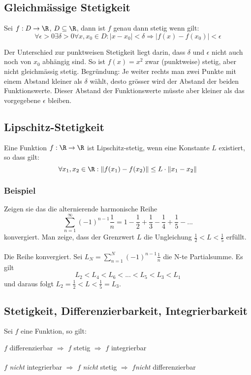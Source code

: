 \subsection{Gleichmässige Stetigkeit}
Sei $f: D \to \R$, $D \subseteq \R$, dann ist $f$ genau dann stetig wenn gilt:
\[
\forall \epsilon > 0 \exists \delta > 0 \forall x,x_0 \in D: |x - x_0| < \delta
\Rightarrow |f(x) - f(x_0)| < \epsilon
\]

Der Unterschied zur punktweisen Stetigkeit liegt darin, dass $\delta$ und
$\epsilon$ nicht auch noch von $x_0$ abhängig sind. So ist $f(x) = x^2$ zwar
(punktweise) stetig, aber nicht gleichmässig stetig. Begründung: Je weiter
rechts man zwei Punkte mit einem Abstand kleiner als $\delta$ wählt, desto
grösser wird der Abstand der beiden Funktionswerte. Dieser Abstand der
Funktionswerte müsste aber kleiner als das vorgegebene $\epsilon$ bleiben.

\subsection{Lipschitz-Stetigkeit}
Eine Funktion $f: \R \to \R$ ist Lipschitz-stetig, wenn eine Konstante $L$
existiert, so dass gilt:
\[
\forall x_1,x_2 \in \R: \|f(x_1) - f(x_2)\| \leq L \cdot \|x_1 - x_2\|
\]

\subsubsection{Beispiel}
Zeigen sie das die alternierende harmonische Reihe \[
\sum_{n=1}^\infty (-1)^{n-1} \frac{1}{n} = 1 - \frac{1}{2} +\frac{1}{3} - \frac{1}{4} + \frac{1}{5} - ...
\]
konvergiert. Man zeige, dass der Grenzwert $L$ die Ungleichung $ \frac{1}{2} < L < \frac{1}{5}$ erfüllt.\\
\\
Die Reihe konvergiert. Sei $L_N = \sum_{n=1}^N (-1)^{n-1} \frac{1}{n}$ die N-te Partialsumme. Es gilt \[
L_2 < L_4 < L_6 < ... < L_5 < L_3 < L_1
\] und daraus folgt $L_2 = \frac{1}{2} < L < \frac{1}{5} = L_3$.


\subsection{Stetigkeit, Differenzierbarkeit, Integrierbarkeit}
Sei $f$ eine Funktion, so gilt:

$f$ differenzierbar $\Rightarrow$ $f$ stetig $\Rightarrow$ $f$ integrierbar\\
\\
$f$ \emph{nicht} integrierbar $\Rightarrow$ $f$ \emph{nicht} stetig $\Rightarrow$ $f$\emph{nicht} differenzierbar  

